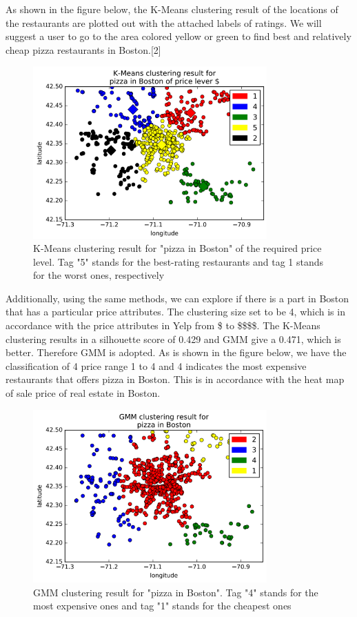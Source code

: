 \documentclass[a4paper]{article}
\begin{document}
As shown in the figure below, the K-Means clustering result of the locations of the restaurants are plotted out with the attached labels of ratings. We will suggest a user to go to the area colored yellow or green to find best and relatively cheap pizza restaurants in Boston.[2] 
\begin{figure}[htbp]
\centering
\includegraphics[width=0.8\textwidth]{Picture2.png}
\caption{\label{fig:data}K-Means clustering result for "pizza in Boston" of the required price level. Tag "5" stands for the best-rating restaurants and tag 1 stands for the worst ones, respectively }
\end{figure}


Additionally, using the same methods, we can explore if there is a part in Boston that has a particular price attributes. The clustering size set to be 4, which is in accordance with the price attributes in Yelp from \$ to \$\$\$\$. The K-Means clustering results in a silhouette score of 0.429 and GMM give a 0.471, which is better. Therefore GMM is adopted. As is shown in the figure below, we have the classification of 4 price range 1 to 4 and 4 indicates the most expensive restaurants that offers pizza in Boston. This is in accordance with the heat map of sale price of real estate in Boston.
\begin{figure}[htbp]
\centering
\includegraphics[width=0.8\textwidth]{Picture3.png}
\caption{\label{fig:data}GMM clustering result for "pizza in Boston". Tag "4" stands for the most expensive ones and tag "1" stands for the cheapest ones}
\end{figure}
\end{document}
